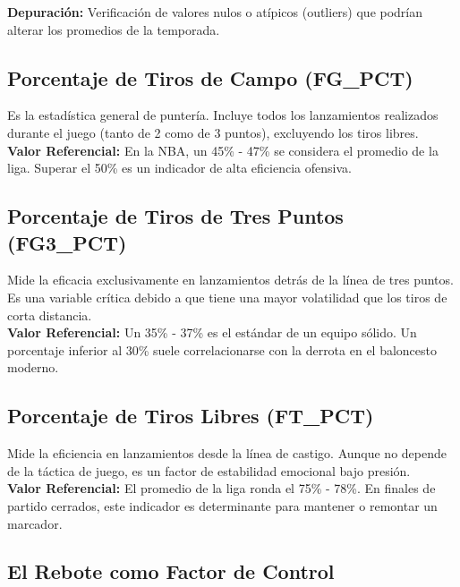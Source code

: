 \documentclass[oneside,11pt]{Latex/Classes/PhDthesisPSnPDF}
\begin{document}
\textbf{Depuración:} Verificación de valores nulos o atípicos (outliers)
que podrían alterar los promedios de la temporada.\\

\subsection{Porcentaje de Tiros de Campo (FG\_PCT)}

Es la estadística general de puntería. Incluye todos los lanzamientos
realizados durante el juego (tanto de 2 como de 3 puntos), excluyendo
los tiros libres.\\

\textbf{Valor Referencial:} En la NBA, un 45\% - 47\% se considera el
promedio de la liga. Superar el 50\% es un indicador de alta eficiencia
ofensiva.\\

\subsection{Porcentaje de Tiros de Tres Puntos (FG3\_PCT)}

Mide la eficacia exclusivamente en lanzamientos detrás de la línea de
tres puntos. Es una variable crítica debido a que tiene una mayor
volatilidad que los tiros de corta distancia.\\

\textbf{Valor Referencial:} Un 35\% - 37\% es el estándar de un equipo
sólido. Un porcentaje inferior al 30\% suele correlacionarse con la
derrota en el baloncesto moderno.\\

\subsection{Porcentaje de Tiros Libres (FT\_PCT)}

Mide la eficiencia en lanzamientos desde la línea de castigo. Aunque no
depende de la táctica de juego, es un factor de estabilidad emocional
bajo presión.\\

\textbf{Valor Referencial:} El promedio de la liga ronda el 75\% - 78\%.
En finales de partido cerrados, este indicador es determinante para
mantener o remontar un marcador.\\

\subsection{El Rebote como Factor de Control}
\end{document}
